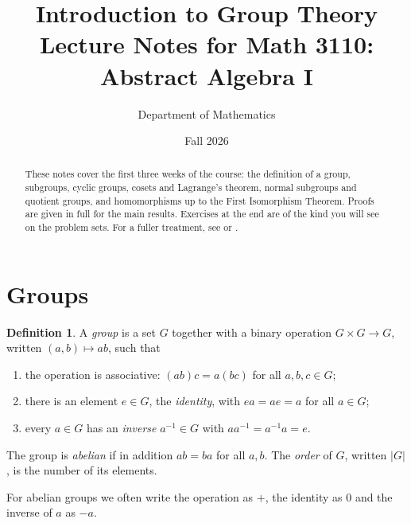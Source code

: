 \documentclass[11pt]{article}
\title{Introduction to Group Theory\\[0.5ex]
  \large Lecture Notes for Math 3110: Abstract Algebra I}
\author{Department of Mathematics}
\date{Fall 2026}
\theoremstyle{plain}
\theoremstyle{definition}
\newtheorem{definition}[theorem]{Definition}
\theoremstyle{remark}
\begin{document}
\maketitle

\begin{abstract}
These notes cover the first three weeks of the course: the definition of a group, subgroups, cyclic groups, cosets and Lagrange's theorem, normal subgroups and quotient groups, and homomorphisms up to the First Isomorphism Theorem. Proofs are given in full for the main results. Exercises at the end are of the kind you will see on the problem sets. For a fuller treatment, see \cite{DF} or \cite{Artin}.
\end{abstract}

\tableofcontents

\section{Groups}

\begin{definition}\label{def:group}
A \emph{group} is a set $G$ together with a binary operation $G \times G \to G$, written $(a, b) \mapsto ab$, such that
\begin{enumerate}[label=\textup{(G\arabic*)}]
  \item \label{ax:assoc} the operation is associative: $(ab)c = a(bc)$ for all $a, b, c \in G$;
  \item \label{ax:id} there is an element $e \in G$, the \emph{identity}, with $ea = ae = a$ for all $a \in G$;
  \item \label{ax:inv} every $a \in G$ has an \emph{inverse} $a^{-1} \in G$ with $aa^{-1} = a^{-1}a = e$.
\end{enumerate}
The group is \emph{abelian} if in addition $ab = ba$ for all $a, b$. The \emph{order} of $G$, written $|G|$, is the number of its elements.
\end{definition}

For abelian groups we often write the operation as $+$, the identity as $0$ and the inverse of $a$ as $-a$.
\end{document}
